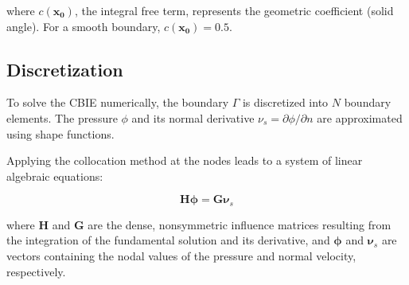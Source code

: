where $c(\mathbf{x_0})$, the integral free term, represents the geometric coefficient (solid angle). For a smooth boundary, $c(\mathbf{x_0}) = 0.5$.

\subsection{Discretization} \label{subsec:bem-discretization}


To solve the \ac{CBIE} numerically, the boundary $\Gamma$ is discretized into $N$ boundary elements. The pressure $\phi$ and its normal derivative $\nu_s = \partial \phi / \partial n$ are approximated using shape functions. 

Applying the collocation method at the nodes leads to a system of linear algebraic equations:

\begin{equation}
    \mathbf{H} \boldsymbol{\phi} = \mathbf{G} \boldsymbol{\nu}_s
\end{equation}

where $\mathbf{H}$ and $\mathbf{G}$ are the dense, nonsymmetric influence matrices resulting from the integration of the fundamental solution and its derivative, and $\boldsymbol{\phi}$ and $\boldsymbol{\nu}_s$ are vectors containing the nodal values of the pressure and normal velocity, respectively.

